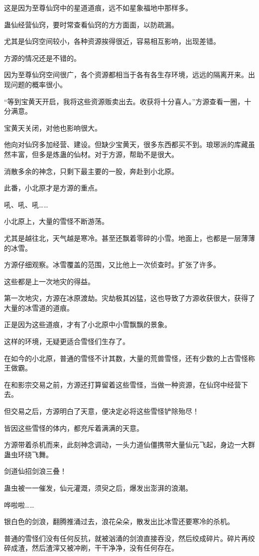 \begin{this_body}
这是因为至尊仙窍中的星道道痕，远不如星象福地中那样多。

蛊仙经营仙窍，要时常查看仙窍的方方面面，以防疏漏。

尤其是仙窍空间较小，各种资源挨得很近，容易相互影响，出现差错。

方源的情况还是不错的。

因为至尊仙窍空间很广，各个资源都相当于各有各生存环境，远远的隔离开来。出现问题的概率很小。

“等到宝黄天开启，我将这些资源贩卖出去。收获将十分喜人。”方源查看一圈，十分满意。

宝黄天关闭，对他也影响很大。

他向对仙窍多加经营、建设。但缺少宝黄天，很多东西都买不到。琅琊派的库藏虽然丰富，但多是炼蛊的仙材。对于方源，帮助不是很大。

消散多余的神念，只剩下最主要的一股，奔赴到小北原。

此番，小北原才是方源的重点。

吼、吼、吼……

小北原上，大量的雪怪不断游荡。

尤其是越往北，天气越是寒冷。甚至还飘着零碎的小雪。地面上，也都是一层薄薄的冰雪。

方源仔细观察。冰雪覆盖的范围，又比他上一次侦查时。扩张了许多。

这些都是上一次地灾的得益。

第一次地灾，方源在冰原渡劫。灾劫极其凶猛，这也导致了方源收获很大，获得了大量的冰雪道的道痕。

正是因为这些道痕，才有了小北原中小雪飘飘的景象。

这样的环境，无疑更适合雪怪们生存了。

在如今的小北原，普通的雪怪不计其数，大量的荒兽雪怪，还有少数的上古雪怪称王做霸。

在和影宗交易之前，方源还打算留着这些雪怪，当做一种资源，在仙窍中经营下去。

但交易之后，方源明白了天意，便决定必将这些雪怪铲除殆尽！

皆因这些雪怪的体内，都充斥着满满的天意。

方源带着杀机而来，此刻神念调动，一头力道仙僵携带大量仙元飞起，身边一大群蛊虫环绕飞舞。

剑道仙招剑浪三叠！

蛊虫被一一催发，仙元灌溉，须臾之后，爆发出澎湃的浪潮。

哗啦啦……

银白色的剑浪，翻腾推涌过去，浪花朵朵，散发出比冰雪还要寒冷的杀机。

普通的雪怪们没有任何反抗，就被汹涌的剑浪直接吞没，然后绞成碎片。碎片再绞碎成渣，然后渣滓又被冲刷，干干净净，没有任何存在。


\end{this_body}

